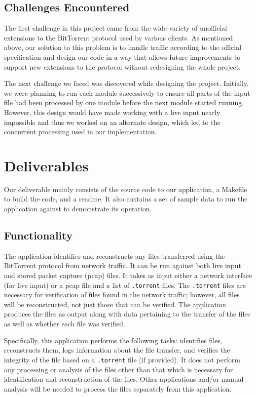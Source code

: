 \documentclass{acm_proc_article-sp}
\begin{document}
\subsection{Challenges Encountered}
The first challenge in this project came from the wide variety of unofficial
extensions to the BitTorrent protocol used by various clients. As mentioned
above, our solution to this problem is to handle traffic according to the
official specification and design our code in a way that allows future
improvements to support new extensions to the protocol without redesigning the
whole project.

The next challenge we faced was discovered while designing the project.
Initially, we were planning to run each module successively to ensure all parts
of the input file had been processed by one module before the next module
started running. However, this design would have made working with a live input
nearly impossible and thus we worked on an alternate design, which led to the
concurrent processing used in our implementation.

\section{Deliverables}
Our deliverable mainly consists of the source code to our application, a
Makefile to build the code, and a readme. It also contains a set of sample data
to run the application against to demonstrate its operation.

\subsection{Functionality}
The application identifies and reconstructs any files transferred using the
BitTorrent protocol from network traffic. It can be run against both live input
and stored packet capture (pcap) files. It takes as input either a network
interface (for live input) or a pcap file and a list of \texttt{.torrent}
files. The \texttt{.torrent} files are necessary for verification of files found
in the network traffic; however, all files will be reconstructed, not just those
that can be verified. The application produces the files as output along with
data pertaining to the transfer of the files as well as whether each file was
verified.

Specifically, this application performs the following tasks: identifies files,
reconstructs them, logs information about the file transfer, and verifies the
integrity of the file based on a \texttt{.torrent} file (if provided). It does
not perform any processing or analysis of the files other than that which is
necessary for identification and reconstruction of the files. Other applications
and/or manual analysis will be needed to process the files separately from this
application.
\end{document}
